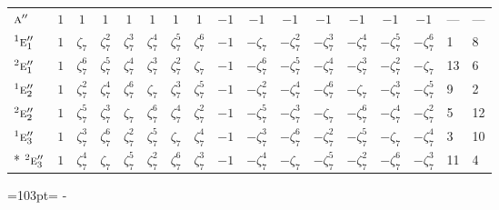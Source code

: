 \documentclass[10pt,a4paper]{article}
\newcommand{\needspace}[1]{\par\penalty-100\begingroup\dimen0=#1\relax\dimen2=\pagegoal
  \advance\dimen2-\pagetotal\ifdim\dimen0>\dimen2\relax\ifdim\dimen2>0pt\vfil\break\fi\fi
  \endgroup}
\numberwithin{equation}{section}
\newcommand{\irr}[1]{\text{\normalfont\scshape #1}}
\newcommand{\conjpair}[1]{{}^{#1}}
\newcommand{\rootunity}[1]{\zeta_{#1}}
\begin{document}
{\begin{longtable}{@{}lccccccccccccccll@{}}
$\irr{a}''$ & $1$ & $1$ & $1$ & $1$ & $1$ & $1$ & $1$ & $-1$ & $-1$ & $-1$ & $-1$ & $-1$ & $-1$ & $-1$ & --- & ---\\
$\conjpair{1}\irr{e}_{1}''$ & $1$ & $\rootunity{7}$ & $\rootunity{7}^{2}$ & $\rootunity{7}^{3}$ & $\rootunity{7}^{4}$ & $\rootunity{7}^{5}$ & $\rootunity{7}^{6}$ & $-1$ & $-\rootunity{7}$ & $-\rootunity{7}^{2}$ & $-\rootunity{7}^{3}$ & $-\rootunity{7}^{4}$ & $-\rootunity{7}^{5}$ & $-\rootunity{7}^{6}$ & 1 & 8\\
$\conjpair{2}\irr{e}_{1}''$ & $1$ & $\rootunity{7}^{6}$ & $\rootunity{7}^{5}$ & $\rootunity{7}^{4}$ & $\rootunity{7}^{3}$ & $\rootunity{7}^{2}$ & $\rootunity{7}$ & $-1$ & $-\rootunity{7}^{6}$ & $-\rootunity{7}^{5}$ & $-\rootunity{7}^{4}$ & $-\rootunity{7}^{3}$ & $-\rootunity{7}^{2}$ & $-\rootunity{7}$ & 13 & 6\\
$\conjpair{1}\irr{e}_{2}''$ & $1$ & $\rootunity{7}^{2}$ & $\rootunity{7}^{4}$ & $\rootunity{7}^{6}$ & $\rootunity{7}$ & $\rootunity{7}^{3}$ & $\rootunity{7}^{5}$ & $-1$ & $-\rootunity{7}^{2}$ & $-\rootunity{7}^{4}$ & $-\rootunity{7}^{6}$ & $-\rootunity{7}$ & $-\rootunity{7}^{3}$ & $-\rootunity{7}^{5}$ & 9 & 2\\
$\conjpair{2}\irr{e}_{2}''$ & $1$ & $\rootunity{7}^{5}$ & $\rootunity{7}^{3}$ & $\rootunity{7}$ & $\rootunity{7}^{6}$ & $\rootunity{7}^{4}$ & $\rootunity{7}^{2}$ & $-1$ & $-\rootunity{7}^{5}$ & $-\rootunity{7}^{3}$ & $-\rootunity{7}$ & $-\rootunity{7}^{6}$ & $-\rootunity{7}^{4}$ & $-\rootunity{7}^{2}$ & 5 & 12\\
$\conjpair{1}\irr{e}_{3}''$ & $1$ & $\rootunity{7}^{3}$ & $\rootunity{7}^{6}$ & $\rootunity{7}^{2}$ & $\rootunity{7}^{5}$ & $\rootunity{7}$ & $\rootunity{7}^{4}$ & $-1$ & $-\rootunity{7}^{3}$ & $-\rootunity{7}^{6}$ & $-\rootunity{7}^{2}$ & $-\rootunity{7}^{5}$ & $-\rootunity{7}$ & $-\rootunity{7}^{4}$ & 3 & 10\\*
$\conjpair{2}\irr{e}_{3}''$ & $1$ & $\rootunity{7}^{4}$ & $\rootunity{7}$ & $\rootunity{7}^{5}$ & $\rootunity{7}^{2}$ & $\rootunity{7}^{6}$ & $\rootunity{7}^{3}$ & $-1$ & $-\rootunity{7}^{4}$ & $-\rootunity{7}$ & $-\rootunity{7}^{5}$ & $-\rootunity{7}^{2}$ & $-\rootunity{7}^{6}$ & $-\rootunity{7}^{3}$ & 11 & 4\\
\bottomrule\end{longtable}}
\needspace{103pt}
\end{document}
